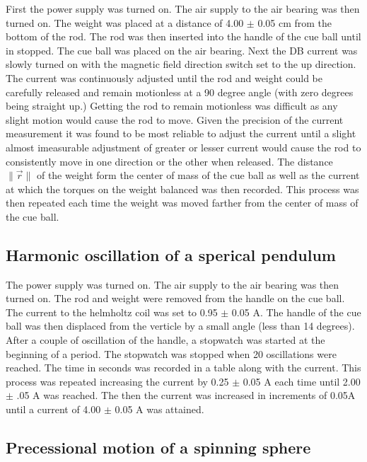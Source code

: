 \documentclass[twocolumn,secnumarabic,amssymb, nobibnotes, aps, pra]{revtex4}
\newcommand{\norm}[1]{\lVert#1\rVert}
\begin{document}
First the power supply was turned on.  The air supply to the air bearing was then turned on. The weight was placed at a distance of 4.00 $\pm$ 0.05 cm from the bottom of the rod.  The rod was then inserted into the handle of the cue ball until in stopped.  The cue ball was placed on the air bearing.  Next the DB current was slowly turned on with the magnetic field direction switch set to the up direction.  The current was continuously adjusted until the rod and weight could be carefully released and remain motionless at a 90 degree angle (with zero degrees being straight up.)  Getting the rod to remain motionless was difficult as any slight motion would cause the rod to move.  Given the precision of the current measurement it was found to be most reliable to adjust the current until a slight almost imeasurable adjustment of greater or lesser current would cause the rod to consistently move in one direction or the other when released.  The distance $\norm{\vec{r}}$ of the weight form the center of mass of the cue ball as well as the current at which the torques on the weight balanced was then recorded.  This process was then repeated each time the weight was moved farther from the center of mass of the cue ball.  

\subsection{Harmonic oscillation of a sperical pendulum}

The power supply was turned on.  The air supply to the air bearing was then turned on.  The rod and weight were removed from the handle on the cue ball.  The current to the helmholtz coil was set to 0.95 $\pm$ 0.05 A.  The handle of the cue ball was then displaced from the verticle by a small angle (less than 14 degrees).  After a couple of oscillation of the handle, a stopwatch was started at the beginning of a period.  The stopwatch was stopped when 20 oscillations were reached.  The time in seconds was recorded in a table along with the current.  This process was repeated increasing the current by 0.25 $\pm$ 0.05 A each time until 2.00 $\pm$ .05 A was reached.  The then the current was increased in increments of 0.05A until a current of 4.00 $\pm$ 0.05 A was attained.  


\subsection{Precessional motion of a spinning sphere}
\end{document}
